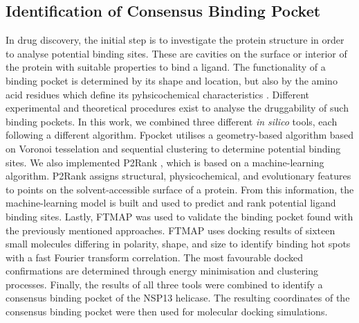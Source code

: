 \documentclass[11pt, letterpaper, titlepage]{article}
\renewcommand{\cite}{\parencite}
\begin{document}
\subsection{Identification of Consensus Binding Pocket}
In drug discovery, the initial step is to investigate the protein structure in order to analyse potential binding sites. These are cavities on the surface or interior of the protein with suitable properties to bind a ligand. The functionality of a binding pocket is determined by its shape and location, but also by the amino acid residues which define its pyhsicochemical characteristics \cite{Stank_2016}. 
Different experimental and theoretical procedures exist to analyse the druggability of such binding pockets. In this work, we combined three different \textit{in silico} tools, each following a different algorithm. Fpocket \cite{package_Fpocket} utilises a geometry-based algorithm based on Voronoi tesselation and sequential clustering to determine potential binding sites. We also implemented P2Rank \cite{package_P2Rank, package_PrankWeb, package_PrankWeb3}, which is based on a machine-learning algorithm. 
P2Rank assigns structural, physicochemical, and evolutionary features to points on the solvent-accessible surface of a protein. From this information, the machine-learning model is built and used to predict and rank potential ligand binding sites. Lastly, FTMAP \cite{package_FTMAP} was used to validate the binding pocket found with the previously mentioned approaches. FTMAP uses docking results of sixteen small molecules differing in polarity, shape, and size to identify binding hot spots with a fast Fourier transform correlation. The most favourable docked confirmations are determined through energy minimisation and clustering processes.
Finally, the results of all three tools were combined to identify a consensus binding pocket of the NSP13 helicase. The resulting coordinates of the consensus binding pocket were then used for molecular docking simulations. 
\end{document}
